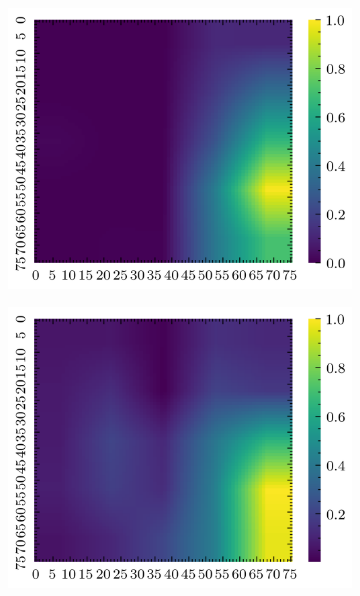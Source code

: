 \documentclass[../document.tex]{subfiles}
\begin{document}
\begin{figure}[H]
    \begin{subfigure}[b]{0.19\textwidth}
        \includegraphics[width=\linewidth]{../img/5/quarry/worst/grad-cam-2d-0.png}
    \end{subfigure}
    \begin{subfigure}[b]{0.19\textwidth}
        \includegraphics[width=\linewidth]{../img/5/quarry/worst/grad-cam-2d-1.png}
    \end{subfigure}  
    \begin{subfigure}[b]{0.19\textwidth}

\end{subfigure}
\end{figure}
\end{document}
